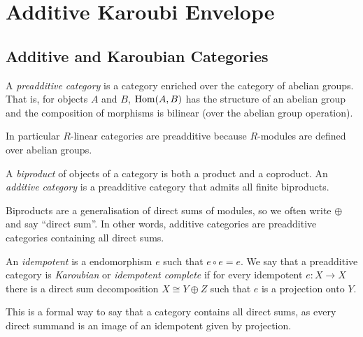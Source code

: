 \section{Additive Karoubi Envelope}
\label{sec:additive-karoubi}



\subsection*{Additive and Karoubian Categories}

\begin{definition}
    A \textit{preadditive category} is a category enriched over the category of abelian groups. That is, for objects $A$ and $B$, $\operatorname{Hom}(A,B)$ has the structure of an abelian group and the composition of morphisms is bilinear (over the abelian group operation).
\end{definition}

\begin{remark}
    In particular $R$-linear categories are preadditive because $R$-modules are defined over abelian groups.
\end{remark}

\begin{definition}
    A \textit{biproduct} of objects of a category is both a product and a coproduct.
    An \textit{additive category} is a preadditive category that admits all finite biproducts.
\end{definition}

Biproducts are a generalisation of direct sums of modules, so we often write $\oplus$ and say ``direct sum''. In other words, additive categories are preadditive categories containing all direct sums.

\begin{definition}
    An \textit{idempotent} is a endomorphism $e$ such that $e \circ e = e$.
    We say that a preadditive category is \textit{Karoubian} or \textit{idempotent complete} if for every idempotent $e: X \to X$ there is a direct sum decomposition $X \cong Y \oplus Z$ such that $e$ is a projection onto $Y$.
\end{definition}

This is a formal way to say that a category contains all direct sums, as every direct summand is an image of an idempotent given by projection.




